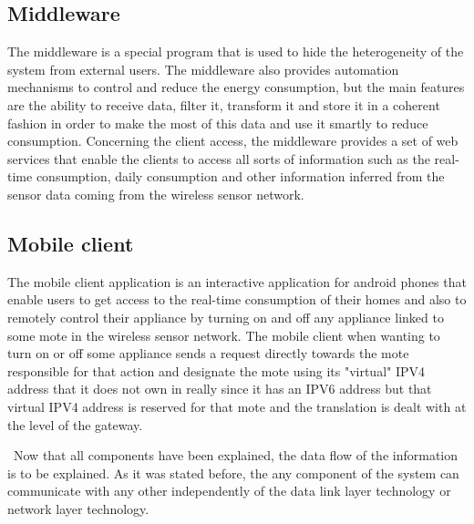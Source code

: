 \documentclass[conference]{IEEEtran}
\begin{document}
\subsection{Middleware}
The middleware is a special program that is used to hide the heterogeneity of the system from external users. The middleware also provides automation mechanisms to control and reduce the energy consumption, but the main features are the ability to receive data, filter it, transform it and store it in a coherent fashion in order to make the most of this data and use it smartly to reduce consumption. Concerning the client access, the middleware provides a set of web services that enable the clients to access all sorts of information such as the real-time consumption, daily consumption and other information inferred from the sensor data coming from the wireless sensor network.

\subsection{Mobile client}
The mobile client application is an interactive application for android phones that enable users to get access to the real-time consumption of their homes and also to remotely control their appliance by turning on and off any appliance linked to some mote in the wireless sensor network. The mobile client when wanting to turn on or off some appliance sends a request directly towards the mote responsible for that action and designate the mote using its "virtual" IPV4 address that it does not own in really since it has an IPV6 address but that virtual IPV4 address is reserved for that mote and the translation is dealt with at the level of the gateway.

\ Now that all components have been explained, the data flow of the information is to be explained. As it was stated before, the any component of the system can communicate with any other independently of the data link layer technology or network layer technology.
\end{document}
